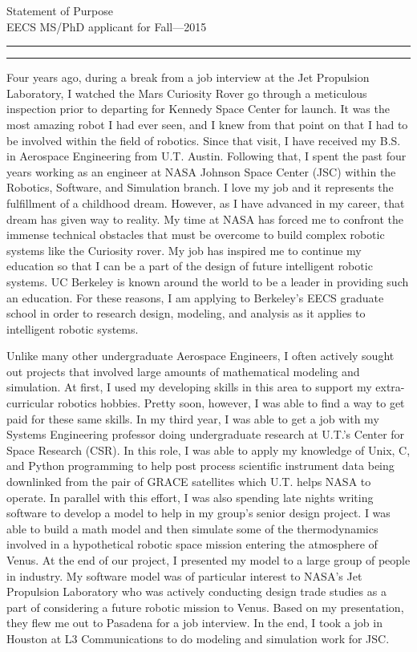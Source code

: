 \documentclass{article}
\newcommand{\soptitle}{Statement of Purpose}
\begin{document}
\begin{center}\LARGE\soptitle\\
\large EECS MS/PhD applicant for Fall---2015
\end{center}

\hrule
\vspace{1pt}
\hrule height 1pt

\bigskip

Four years ago, during a break from a job interview at the Jet Propulsion Laboratory, I watched the Mars Curiosity Rover go through a meticulous inspection prior to departing for Kennedy Space Center for launch. It was the most amazing robot I had ever seen, and I knew from that point on that I had to be involved within the field of robotics. Since that visit, I have received my B.S. in Aerospace Engineering from U.T. Austin. Following that, I spent the past four years working as an engineer at NASA Johnson Space Center (JSC) within the Robotics, Software, and Simulation branch. I love my job and it represents the fulfillment of a childhood dream. However, as I have advanced in my career, that dream has given way to reality. My time at NASA has forced me to confront the immense technical obstacles that must be overcome to build complex robotic systems like the Curiosity rover. My job has inspired me to continue my education so that I can be a part of the design of future intelligent robotic systems. UC Berkeley is known around the world to be a leader in providing such an education. For these reasons, I am applying to Berkeley's EECS graduate school in order to research design, modeling, and analysis as it applies to intelligent robotic systems.


Unlike many other undergraduate Aerospace Engineers, I often actively sought out projects that involved
large amounts of mathematical modeling and simulation. At first, I used my developing skills in this area to support my extra-curricular robotics hobbies. Pretty soon, however, I was able to find a way to get paid for these same skills. In my third year, I was able to get a job with my Systems Engineering professor doing undergraduate research at U.T.'s Center for Space Research (CSR). In this role, I was able to apply my knowledge of Unix, C, and Python programming to help post process scientific instrument data being downlinked
from the pair of GRACE satellites which U.T. helps NASA to operate. In parallel with this effort,
I was also spending late nights writing software to develop a model to help in my group's senior design project.
I was able to build a math model and then simulate some of the thermodynamics involved in a hypothetical
robotic space mission entering the atmosphere of Venus. At the end of our project, I presented my model to a
large group of people in industry. My software model was of particular interest to NASA's Jet Propulsion
Laboratory who was actively conducting design trade studies as a part of considering a future robotic 
mission to Venus. Based on my presentation, they flew me out to Pasadena for a job interview. In the end,
I took a job in Houston at L3 Communications to do modeling and simulation work for JSC. 
\end{document}
